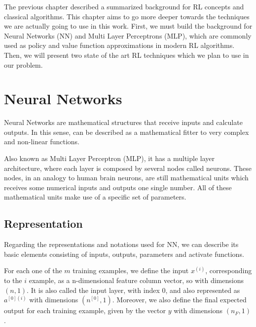 
The previous chapter described a summarized background for RL concepts and classical algorithms. This chapter aims to go more deeper towards the techniques we are actually going to use in this work. First, we must build the background for Neural Networks (NN) and Multi Layer Perceptrons (MLP), which are commonly used as policy and value function approximations in modern RL algorithms. Then, we will present two state of the art RL techniques which we plan to use in our problem.

\section{Neural Networks}

Neural Networks are mathematical structures that receive inputs and calculate outputs. In this sense, can be described as a mathematical fitter to very complex and non-linear functions.

Also known as Multi Layer Perceptron (MLP), it has a multiple layer architecture, where each layer is composed by several nodes called neurons. These nodes, in an analogy to human brain neurons, are still mathematical units which receives some numerical inputs and outputs one single number. All of these mathematical units make use of a specific set of parameters.

\subsection{Representation}

Regarding the representations and notations used for NN, we can describe its basic elements consisting of inputs, outputs, parameters and activate functions.

For each one of the $m$ training examples, we define the input $x^{(i)}$, corresponding to the $i$ example, as a n-dimensional feature column vector, so with dimensions $(n,1)$. It is also called the input layer, with index $0$, and also represented as $a^{[0](i)}$ with dimensions $(n^{[0]},1)$. Moreover, we also define the final expected output for each training example, given by the vector $y$ with dimensions $(n_F,1)$.

